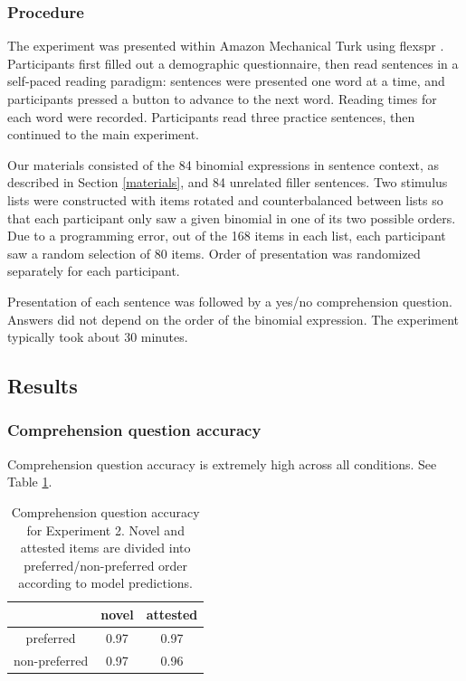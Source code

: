 \documentclass[authoryear]{elsarticle}
\begin{document}
\subsubsection{Procedure}
The experiment was presented within Amazon Mechanical Turk using flexspr \citep{flexspr:cFpvxjkw}. Participants first filled out a demographic questionnaire, then read sentences in a self-paced reading paradigm: sentences were presented one word at a time, and participants pressed a button to advance to the next word. Reading times for each word were recorded. Participants read three practice sentences, then continued to the main experiment.

Our materials consisted of the 84 binomial expressions in sentence context, as described in Section \ref{materials}, and 84 unrelated filler sentences. Two stimulus lists were constructed with items rotated and counterbalanced between lists so that each participant only saw a given binomial in one of its two possible orders. Due to a programming error, out of the 168 items in each list, each participant saw a random selection of 80 items. Order of presentation was randomized separately for each participant.

Presentation of each sentence was followed by a yes/no comprehension question. Answers did not depend on the order of the binomial expression. The experiment typically took about 30 minutes.


\subsection{Results}

\subsubsection{Comprehension question accuracy}
Comprehension question accuracy is extremely high across all conditions. See Table \ref{t:qcorrect}.


\begin{table}[t]
\centering
\begin{tabular}{ccc}\hline\hline
& novel & attested \\\hline
preferred & 0.97 & 0.97 \\
non-preferred & 0.97 & 0.96 \\\hline
\end{tabular}
\caption{Comprehension question accuracy for Experiment 2. Novel and attested items are divided into preferred/non-preferred order according to model predictions.}\label{t:qcorrect}
\end{table}
\end{document}
